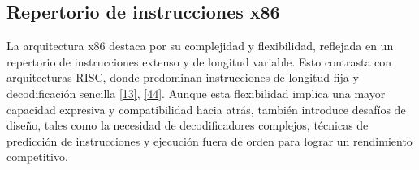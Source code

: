 \documentclass[12pt,oneside]{templates/unerthesis}
\begin{document}
\begin{table}[!h]
\centering
\caption{\label{tab:evolucionx86}Línea de Tiempo de la Evolución de la Arquitectura x86}
\centering
{}
\end{table}

\hypertarget{repertorio-de-instrucciones-x86}{%
\subsection{Repertorio de instrucciones x86}\label{repertorio-de-instrucciones-x86}}

La arquitectura x86 destaca por su complejidad y flexibilidad, reflejada en un repertorio de instrucciones extenso y de longitud variable. Esto contrasta con arquitecturas RISC, donde predominan instrucciones de longitud fija y decodificación sencilla \protect\hyperlink{ref-hennessy2017computer}{{[}13{]}}, \protect\hyperlink{ref-brey_intel_microprocessors}{{[}44{]}}. Aunque esta flexibilidad implica una mayor capacidad expresiva y compatibilidad hacia atrás, también introduce desafíos de diseño, tales como la necesidad de decodificadores complejos, técnicas de predicción de instrucciones y ejecución fuera de orden para lograr un rendimiento competitivo.
\end{document}
